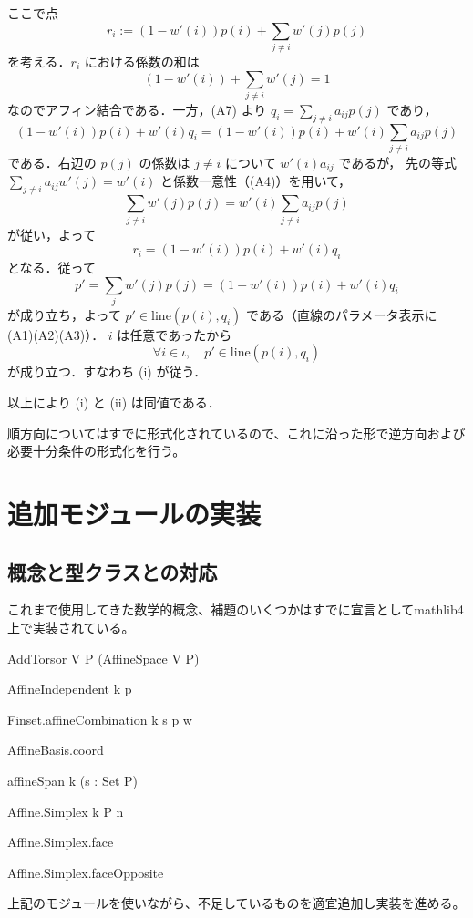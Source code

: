 \documentclass[a4paper,12pt]{bxjsbook}
\makeatletter
\newlength{\customindent}
\newenvironment{body}{
  \par
  \begingroup
  \setlength{\leftskip}{\customindent}
  \setlength{\rightskip}{0pt}
  \setlength{\parindent}{1em}
  \setlength{\displayindent}{\customindent}
  \setlength{\displaywidth}{\dimexpr\linewidth-\customindent\relax}
}{
  \par
  \endgroup
}
\theoremstyle{theorem}
\renewenvironment{proof}[1][\proofname]{%
  \par\pushQED{\qed}%
  \normalfont
  \topsep6\p@\@plus6\p@\relax
  \list{}{%
    \leftmargin=\customindent
    \rightmargin=0pt
    \labelwidth=0pt
    \labelsep=0pt
    \itemindent=0pt
    \listparindent=0pt
    \parsep=0pt
  }%
  \item[\itshape #1\@addpunct{.}\hspace{0.5em}]%
  \setlength{\displayindent}{\customindent}%
  \setlength{\displaywidth}{\dimexpr\linewidth-\customindent\relax}%
  \ignorespaces
}{%
  \popQED\endlist\@endpefalse
}
\makeatother
\begin{document}
\begin{proof}
        ここで点
        \[
          r_i:=(1-w'(i))p(i)+\sum_{j\neq i}w'(j)p(j)
        \]
        を考える．$r_i$ における係数の和は
        \[
          (1-w'(i))+\sum_{j\neq i}w'(j)=1
        \]
        なのでアフィン結合である．一方，(A7) より $q_i=\sum_{j\neq i}a_{ij}p(j)$ であり，
        \[
          (1-w'(i))p(i)+w'(i)q_i
          =(1-w'(i))p(i)+w'(i)\sum_{j\neq i}a_{ij}p(j)
        \]
        である．右辺の $p(j)$ の係数は $j\neq i$ について $w'(i)a_{ij}$ であるが，
        先の等式 $\sum_{j\neq i}a_{ij}w'(j)=w'(i)$ と係数一意性（(A4)）を用いて，
        \[
          \sum_{j\neq i}w'(j)p(j)=w'(i)\sum_{j\neq i}a_{ij}p(j)
        \]
        が従い，よって
        \[
          r_i=(1-w'(i))p(i)+w'(i)q_i
        \]
        となる．従って
        \[
          p'=\sum_{j}w'(j)p(j)=(1-w'(i))p(i)+w'(i)q_i
        \]
        が成り立ち，よって $p'\in \mathrm{line}(p(i),q_i)$ である（直線のパラメータ表示に (A1)(A2)(A3)）．
        $i$ は任意であったから
        \[
          \forall i\in\iota,\quad p'\in \mathrm{line}(p(i),q_i)
        \]
        が成り立つ．すなわち (i) が従う．
        
        以上により (i) と (ii) は同値である．
    \end{proof}
        
    \begin{body}
        \indent 順方向についてはすでに形式化されているので、これに沿った形で逆方向および必要十分条件の形式化を行う。\\
    \end{body}

    \section{追加モジュールの実装}
    \subsection{概念と型クラスとの対応}
    \begin{body}
      \indent これまで使用してきた数学的概念、補題のいくつかはすでに宣言としてmathlib4上で実装されている。
      \begin{bodyitemize}
        \item[アフィン空間] AddTorsor V P (AffineSpace V P)
        \item[アフィン独立] AffineIndependent k p
        \item[アフィン結合] Finset.affineCombination k s p w
        \item[重心座標] AffineBasis.coord
        \item[アフィン包] affineSpan k (s : Set P)
        \item[凸包] %
        \item[単体] Affine.Simplex k P n
        \item[面] Affine.Simplex.face
        \item[対向面] Affine.Simplex.faceOpposite
      \end{bodyitemize}

      \indent 上記のモジュールを使いながら、不足しているものを適宜追加し実装を進める。
    \end{body}
\end{document}
